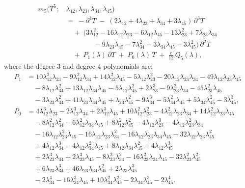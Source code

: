 \documentclass[11pt]{article}
\begin{document}
\begin{equation}\label{eq:m5-stable}
\begin{aligned}
m_5(T^5;\,
  &\lambda_{12},\lambda_{23},\lambda_{34},\lambda_{45})
\\[2pt]
&=\;
-\partial^4 T
\;-\;
(2\lambda_{12} + 4\lambda_{23}
  + \lambda_{34} + 3\lambda_{45})\,\partial^3 T
\\[2pt]
&\quad +\;
(3\lambda_{12}^2 - 16\lambda_{12}\lambda_{23}
  - 6\lambda_{12}\lambda_{45}
  - 13\lambda_{23}^2 + 7\lambda_{23}\lambda_{34}
\\
&\qquad\qquad
  - 9\lambda_{23}\lambda_{45}
  - 7\lambda_{34}^2
  + 3\lambda_{34}\lambda_{45}
  - 3\lambda_{45}^2)\,\partial^2 T
\\[2pt]
&\quad +\; P_1(\lambda)\,\partial T
\;+\; P_0(\lambda)\, T
\;+\; \tfrac{c}{12}\, Q_5(\lambda),
\end{aligned}
\end{equation}
where the degree-$3$ and degree-$4$ polynomials are:
\begin{align*}
P_1
&=
10\lambda_{12}^2\lambda_{23}
- 9\lambda_{12}^2\lambda_{34}
+ 14\lambda_{12}^2\lambda_{45}
- 5\lambda_{12}\lambda_{23}^2
- 20\lambda_{12}\lambda_{23}\lambda_{34}
- 49\lambda_{12}\lambda_{23}\lambda_{45}
\\
&\quad
- 8\lambda_{12}\lambda_{34}^2
+ 13\lambda_{12}\lambda_{34}\lambda_{45}
- 5\lambda_{12}\lambda_{45}^2
+ 2\lambda_{23}^3
- 9\lambda_{23}^2\lambda_{34}
- 45\lambda_{23}^2\lambda_{45}
\\
&\quad
- 3\lambda_{23}\lambda_{34}^2
+ 41\lambda_{23}\lambda_{34}\lambda_{45}
+ \lambda_{23}\lambda_{45}^2
- 9\lambda_{34}^3
- 5\lambda_{34}^2\lambda_{45}
+ 5\lambda_{34}\lambda_{45}^2
- 3\lambda_{45}^3,
\\[6pt]
P_0
&=
4\lambda_{12}^3\lambda_{23}
- 2\lambda_{12}^3\lambda_{34}
+ 2\lambda_{12}^3\lambda_{45}
+ 10\lambda_{12}^2\lambda_{23}^2
- 4\lambda_{12}^2\lambda_{23}\lambda_{34}
+ 14\lambda_{12}^2\lambda_{23}\lambda_{45}
\\
&\quad
- 8\lambda_{12}^2\lambda_{34}^2
- 6\lambda_{12}^2\lambda_{34}\lambda_{45}
+ 8\lambda_{12}^2\lambda_{45}^2
- 4\lambda_{12}\lambda_{23}^3
- 4\lambda_{12}\lambda_{23}^2\lambda_{34}
\\
&\quad
- 16\lambda_{12}\lambda_{23}^2\lambda_{45}
- 16\lambda_{12}\lambda_{23}\lambda_{34}^2
- 16\lambda_{12}\lambda_{23}\lambda_{34}\lambda_{45}
- 32\lambda_{12}\lambda_{23}\lambda_{45}^2
\\
&\quad
+ 4\lambda_{12}\lambda_{34}^3
- 4\lambda_{12}\lambda_{34}^2\lambda_{45}
+ 8\lambda_{12}\lambda_{34}\lambda_{45}^2
+ 4\lambda_{12}\lambda_{45}^3
\\
&\quad
+ 2\lambda_{23}^3\lambda_{34}
+ 2\lambda_{23}^3\lambda_{45}
- 8\lambda_{23}^2\lambda_{34}^2
- 16\lambda_{23}^2\lambda_{34}\lambda_{45}
- 32\lambda_{23}^2\lambda_{45}^2
\\
&\quad
+ 6\lambda_{23}\lambda_{34}^3
+ 46\lambda_{23}\lambda_{34}\lambda_{45}^2
+ 2\lambda_{23}\lambda_{45}^3
\\
&\quad
- 2\lambda_{34}^4
- 16\lambda_{34}^3\lambda_{45}
+ 10\lambda_{34}^2\lambda_{45}^2
- 2\lambda_{34}\lambda_{45}^3
- 2\lambda_{45}^4.
\end{align*}
\end{document}
